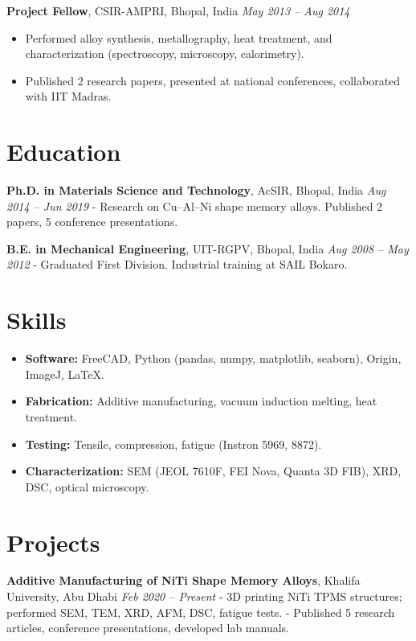 \documentclass[11pt,a4paper]{article}
\begin{document}
\textbf{Project Fellow}, CSIR-AMPRI, Bhopal, India \hfill \textit{May 2013 -- Aug 2014}  
\begin{itemize}[leftmargin=*]
    \item Performed alloy synthesis, metallography, heat treatment, and characterization (spectroscopy, microscopy, calorimetry).
    \item Published 2 research papers, presented at national conferences, collaborated with IIT Madras.
\end{itemize}

\section*{Education}

\textbf{Ph.D. in Materials Science and Technology}, AcSIR, Bhopal, India \hfill \textit{Aug 2014 -- Jun 2019}  
- Research on Cu–Al–Ni shape memory alloys. Published 2 papers, 5 conference presentations.

\textbf{B.E. in Mechanical Engineering}, UIT-RGPV, Bhopal, India \hfill \textit{Aug 2008 -- May 2012}  
- Graduated First Division. Industrial training at SAIL Bokaro.

\section*{Skills}
\begin{itemize}[leftmargin=*]
    \item \textbf{Software:} FreeCAD, Python (pandas, numpy, matplotlib, seaborn), Origin, ImageJ, LaTeX.
    \item \textbf{Fabrication:} Additive manufacturing, vacuum induction melting, heat treatment.
    \item \textbf{Testing:} Tensile, compression, fatigue (Instron 5969, 8872).
    \item \textbf{Characterization:} SEM (JEOL 7610F, FEI Nova, Quanta 3D FIB), XRD, DSC, optical microscopy.
\end{itemize}

\section*{Projects}

\textbf{Additive Manufacturing of NiTi Shape Memory Alloys}, Khalifa University, Abu Dhabi \hfill \textit{Feb 2020 -- Present}  
- 3D printing NiTi TPMS structures; performed SEM, TEM, XRD, AFM, DSC, fatigue tests.  
- Published 5 research articles, conference presentations, developed lab manuals.  
\end{document}

